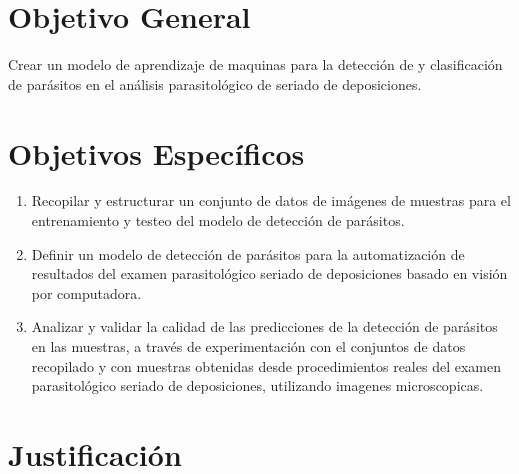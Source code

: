 \documentclass[letter,12pt]{report}
\begin{document}
\section{Objetivo General}
Crear un modelo de aprendizaje de maquinas para la detección de y clasificación de
parásitos en el análisis parasitológico de seriado de deposiciones.

\section{Objetivos Específicos}
\begin{enumerate}\justifying
    \item Recopilar y estructurar un conjunto de datos de imágenes de muestras para el entrenamiento y testeo del modelo de detección de parásitos.
  \item Definir un modelo de detección de parásitos para la automatización de resultados del examen parasitológico seriado de deposiciones basado en visión por computadora.
  \item Analizar y validar la calidad de las predicciones de la detección de parásitos en las muestras, a través de experimentación con el conjuntos de datos recopilado y con muestras obtenidas desde procedimientos reales del examen parasitológico seriado de deposiciones, utilizando imagenes microscopicas.
\end{enumerate}

\section{Justificación}
%
\blindtext
\end{document}
